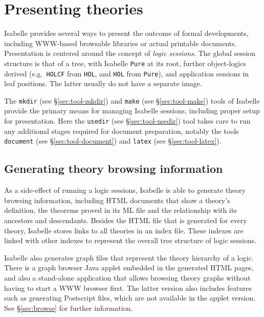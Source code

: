 

\chapter{Presenting theories}\label{ch:present}

Isabelle provides several ways to present the outcome of formal developments,
including WWW-based browsable libraries or actual printable documents.
Presentation is centered around the concept of \emph{logic sessions}.  The
global session structure is that of a tree, with Isabelle \texttt{Pure} at its
root, further object-logics derived (e.g.\ \texttt{HOLCF} from \texttt{HOL},
and \texttt{HOL} from \texttt{Pure}), and application sessions in leaf
positions.  The latter usually do not have a separate {\ML} image.

The \texttt{mkdir} (see \S\ref{sec:tool-mkdir}) and \texttt{make} (see
\S\ref{sec:tool-make}) tools of Isabelle provide the primary means for
managing Isabelle sessions, including proper setup for presentation.  Here the
\texttt{usedir} (see \S\ref{sec:tool-usedir}) tool takes care to run any
additional stages required for document preparation, notably the tools
\texttt{document} (see \S\ref{sec:tool-document}) and \texttt{latex} (see
\S\ref{sec:tool-latex}).


\section{Generating theory browsing information} \label{sec:info}

As a side-effect of running a logic sessions, Isabelle is able to generate
theory browsing information, including HTML documents that show a theory's
definition, the theorems proved in its ML file and the relationship with its
ancestors and descendants.  Besides the HTML file that is generated for every
theory, Isabelle stores links to all theories in an index file. These indexes
are linked with other indexes to represent the overall tree structure of logic
sessions.

Isabelle also generates graph files that represent the theory hierarchy of a
logic.  There is a graph browser Java applet embedded in the generated HTML
pages, and also a stand-alone application that allows browsing theory graphs
without having to start a WWW browser first.  The latter version also includes
features such as generating Postscript files, which are not available in the
applet version.  See \S\ref{sec:browse} for further information.

